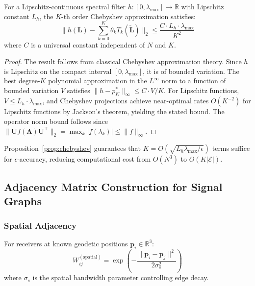 \documentclass[sensors,article,submit,pdftex]{mdpi}
\newcommand{\vect}[1]{\boldsymbol{#1}}
\newcommand{\mat}[1]{\mathbf{#1}}
\newcommand{\R}{\mathbb{R}}
\begin{document}
\begin{proposition}
\label{prop:chebyshev}
For a Lipschitz-continuous spectral filter $h: [0, \lambda_{\max}] \to \R$ with Lipschitz constant $L_h$, the $K$-th order Chebyshev approximation satisfies:
\begin{equation}
    \|h(\mat{L}) - \sum_{k=0}^{K} \theta_k T_k(\tilde{\mat{L}})\|_2 \leq \frac{C \cdot L_h \cdot \lambda_{\max}}{K^2}
    \label{eq:cheby_bound}
\end{equation}
where $C$ is a universal constant independent of $N$ and $K$.
\end{proposition}
\begin{proof}
The result follows from classical Chebyshev approximation theory. Since $h$ is Lipschitz on the compact interval $[0, \lambda_{\max}]$, it is of bounded variation. The best degree-$K$ polynomial approximation in the $L^\infty$ norm to a function of bounded variation $V$ satisfies $\|h - p_K^*\|_\infty \leq C \cdot V / K$. For Lipschitz functions, $V \leq L_h \cdot \lambda_{\max}$, and Chebyshev projections achieve near-optimal rates $O(K^{-2})$ for Lipschitz functions by Jackson's theorem, yielding the stated bound. The operator norm bound follows since $\|\mat{U} f(\mat{\Lambda}) \mat{U}^\top\|_2 = \max_k |f(\lambda_k)| \leq \|f\|_\infty$.
\end{proof}

\begin{remark}
Proposition~\ref{prop:chebyshev} guarantees that $K = O(\sqrt{L_h \lambda_{\max}/\epsilon})$ terms suffice for $\epsilon$-accuracy, reducing computational cost from $O(N^3)$ to $O(K|\mathcal{E}|)$.
\end{remark}

\subsection{Adjacency Matrix Construction for Signal Graphs}

\subsubsection{Spatial Adjacency}
For receivers at known geodetic positions $\vect{p}_i \in \R^3$:
\begin{equation}
    W_{ij}^{(\text{spatial})} = \exp\!\left( -\frac{\|\vect{p}_i - \vect{p}_j\|^2}{2\sigma_s^2} \right)
    \label{eq:spatial_adj}
\end{equation}
where $\sigma_s$ is the spatial bandwidth parameter controlling edge decay.
\end{document}
